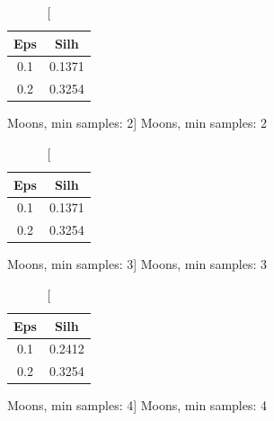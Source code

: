 \documentclass{classrep}
\begin{document}
{{{                \begin{table}[!htbp]
                    \begin{minipage}{.24\textwidth}
                        \centering
                        \begin{tabular}{|c|c|}
                            \hline
                            Eps & Silh \\ \hline
                            0.1 & 0.1371 \\ \hline
                            0.2 & 0.3254 \\ \hline
                        \end{tabular}
                        \caption
                        [Moons, min samples: 2]
                        {Moons, min samples: 2}
                        \label{db_scan_table_Moons_eucl_min_sample2}
                    \end{minipage}
                    \hfill
                    \begin{minipage}{.24\textwidth}
                        \centering
                        \begin{tabular}{|c|c|}
                            \hline
                            Eps & Silh \\ \hline
                            0.1 & 0.1371 \\ \hline
                            0.2 & 0.3254 \\ \hline
                        \end{tabular}
                        \caption
                        [Moons, min samples: 3]
                        {Moons, min samples: 3}
                        \label{db_scan_table_Moons_eucl_min_sample3}
                    \end{minipage}
                    \hfill
                    \begin{minipage}{.24\textwidth}
                        \centering
                        \begin{tabular}{|c|c|}
                            \hline
                            Eps & Silh \\ \hline
                            0.1 & 0.2412 \\ \hline
                            0.2 & 0.3254 \\ \hline
                        \end{tabular}
                        \caption
                        [Moons, min samples: 4]
                        {Moons, min samples: 4}

\end{minipage}
\end{table}}}}
\end{document}
